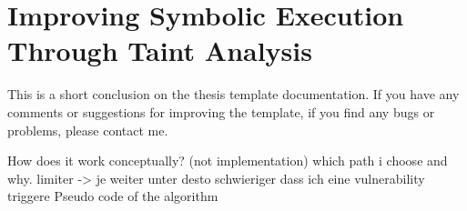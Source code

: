 \chapter{Improving Symbolic Execution Through Taint Analysis}

This is a short conclusion on the thesis template documentation. If you have any comments or suggestions for improving the template, if you find any bugs or problems, please contact me. 

How does it work conceptually? (not implementation) which path i choose and why. limiter -> je weiter unter desto schwieriger dass ich eine vulnerability triggere
Pseudo code of the algorithm
